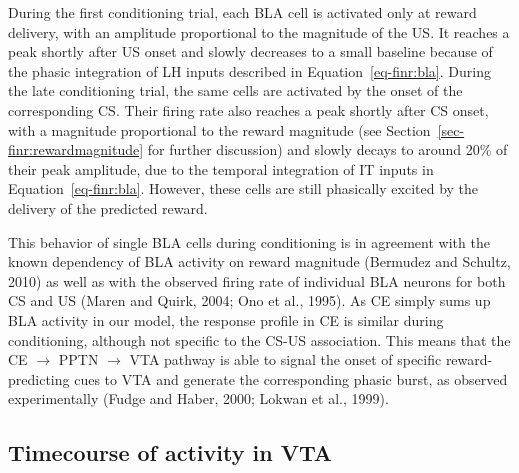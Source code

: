 \documentclass[
  11pt,
  a4paper,
]{scrbook}
\begin{document}
\begin{figure}
\end{figure}%

During the first conditioning trial, each BLA cell is activated only at
reward delivery, with an amplitude proportional to the magnitude of the
US. It reaches a peak shortly after US onset and slowly decreases to a
small baseline because of the phasic integration of LH inputs described
in Equation~\ref{eq-finr:bla}. During the late conditioning trial, the
same cells are activated by the onset of the corresponding CS. Their
firing rate also reaches a peak shortly after CS onset, with a magnitude
proportional to the reward magnitude (see
Section~\ref{sec-finr:rewardmagnitude} for further discussion) and
slowly decays to around 20\% of their peak amplitude, due to the
temporal integration of IT inputs in Equation~\ref{eq-finr:bla}.
However, these cells are still phasically excited by the delivery of the
predicted reward.

This behavior of single BLA cells during conditioning is in agreement
with the known dependency of BLA activity on reward magnitude (Bermudez
and Schultz, 2010) as well as with the observed firing rate of
individual BLA neurons for both CS and US (Maren and Quirk, 2004; Ono et
al., 1995). As CE simply sums up BLA activity in our model, the response
profile in CE is similar during conditioning, although not specific to
the CS-US association. This means that the CE \(\rightarrow\) PPTN
\(\rightarrow\) VTA pathway is able to signal the onset of specific
reward-predicting cues to VTA and generate the corresponding phasic
burst, as observed experimentally (Fudge and Haber, 2000; Lokwan et al.,
1999).

\subsection{Timecourse of activity in VTA}\label{sec-finr:results-vta}
\end{document}
